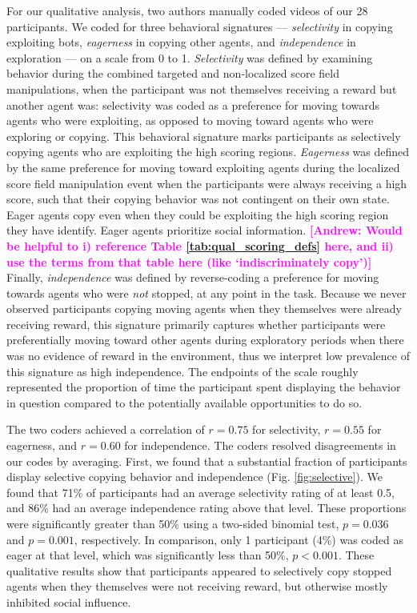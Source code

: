 \documentclass[12pt,letterpaper]{article}
\newcommand{\andrew}[1]{\textcolor{magenta}{\bf [Andrew: #1]}}
\begin{document}
For our qualitative analysis, two authors manually coded videos of our 28 participants. We coded for three behavioral signatures --- \emph{selectivity} in copying exploiting bots, \emph{eagerness} in copying other agents, and \emph{independence} in exploration --- on a scale from 0 to 1. \emph{Selectivity} was defined by examining behavior during the combined targeted and non-localized score field manipulations, when the participant was not themselves receiving a reward but another agent was: selectivity was coded as a preference for moving towards agents who were exploiting, as opposed to moving toward agents who were exploring or copying. This behavioral signature marks participants as selectively copying agents who are exploiting the high scoring regions.
\emph{Eagerness} was defined by the same preference for moving toward exploiting agents during the localized score field manipulation event when the participants were always receiving a high score, such that their copying behavior was not contingent on their own state. Eager agents copy even when they could be exploiting the high scoring region they have identify. Eager agents prioritize social information. \andrew{Would be helpful to i) reference Table \ref{tab:qual_scoring_defs} here, and ii) use the terms from that table here (like `indiscriminately copy')}
Finally, \emph{independence} was defined by reverse-coding a preference for moving towards agents who were \emph{not} stopped, at any point in the task. Because we never observed participants copying moving agents when they themselves were already receiving reward, this signature primarily captures whether participants were preferentially moving toward other agents during exploratory periods when there was no evidence of reward in the environment, thus we interpret low prevalence of this signature as high independence. 
The endpoints of the scale roughly represented the proportion of time the participant spent displaying the behavior in question compared to the potentially available opportunities to do so. 

The two coders achieved a correlation of $r = 0.75$ for selectivity, $r = 0.55$ for eagerness, and $r = 0.60$ for independence. The coders resolved disagreements in our codes by averaging. 
First, we found that a substantial fraction of participants display selective copying behavior and independence (Fig. \ref{fig:selective}). 
We found that 71\% of participants had an average selectivity rating of at least 0.5, and 86\% had an average independence rating above that level. 
These proportions were significantly greater than 50\% using a two-sided binomial test, $p = 0.036$ and $p = 0.001$, respectively.  
In comparison, only 1 participant (4\%) was coded as eager at that level, which was significantly less than 50\%, $p < 0.001$.
These qualitative results show that participants appeared to selectively copy stopped agents when they themselves were not receiving reward, but otherwise mostly inhibited social influence.
\end{document}

